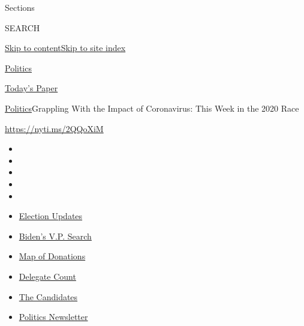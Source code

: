 Sections

SEARCH

\protect\hyperlink{site-content}{Skip to
content}\protect\hyperlink{site-index}{Skip to site index}

\href{https://www.nytimes.com/section/politics}{Politics}

\href{https://myaccount.nytimes.com/auth/login?response_type=cookie\&client_id=vi}{}

\href{https://www.nytimes.com/section/todayspaper}{Today's Paper}

\href{/section/politics}{Politics}\textbar{}Grappling With the Impact of
Coronavirus: This Week in the 2020 Race

\url{https://nyti.ms/2QQoXiM}

\begin{itemize}
\item
\item
\item
\item
\item
\end{itemize}

\begin{itemize}
\item
  \href{https://www.nytimes.com/2020/07/31/us/elections/biden-vs-trump.html?action=click\&pgtype=Article\&state=default\&region=TOP_BANNER\&context=storylines_menu}{Election
  Updates}
\item
  \href{https://www.nytimes.com/article/biden-vice-president-2020.html?action=click\&pgtype=Article\&state=default\&region=TOP_BANNER\&context=storylines_menu}{Biden's
  V.P. Search}
\item
  \href{https://www.nytimes.com/interactive/2020/07/24/us/politics/trump-biden-campaign-donors.html?action=click\&pgtype=Article\&state=default\&region=TOP_BANNER\&context=storylines_menu}{Map
  of Donations}
\item
  \href{https://www.nytimes.com/interactive/2020/us/elections/delegate-count-primary-results.html?action=click\&pgtype=Article\&state=default\&region=TOP_BANNER\&context=storylines_menu}{Delegate
  Count}
\item
  \href{https://www.nytimes.com/interactive/2019/us/politics/2020-presidential-candidates.html?action=click\&pgtype=Article\&state=default\&region=TOP_BANNER\&context=storylines_menu}{The
  Candidates}
\item
  \href{https://www.nytimes.com/newsletters/politics?action=click\&pgtype=Article\&state=default\&region=TOP_BANNER\&context=storylines_menu}{Politics
  Newsletter}
\end{itemize}

